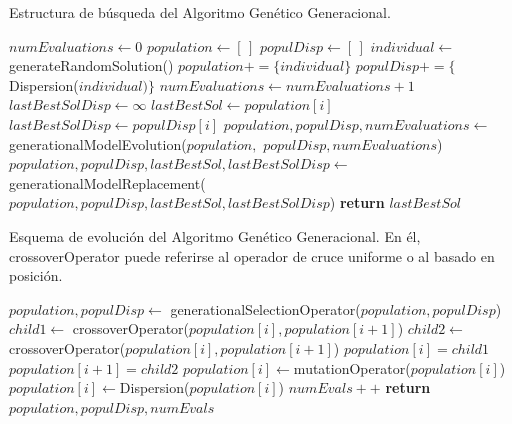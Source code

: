 \begin{algorithm}[H]
    \caption{Estructura de búsqueda del Algoritmo Genético Generacional.}
\begin{algorithmic}
    \State $numEvaluations \leftarrow 0$
    \State $population \leftarrow [ \, ]$
    \State $populDisp \leftarrow [ \, ]$
     
        \State $individual \leftarrow$ generateRandomSolution()
        \State $population += \{individual\}$
        \State $populDisp += \{$Dispersion($individual)\}$
        \State $numEvaluations \leftarrow numEvaluations + 1$
    \EndFor
    \State
    \State $lastBestSolDisp \leftarrow \infty$
            \State $lastBestSol \leftarrow population[i]$
            \State $lastBestSolDisp \leftarrow populDisp[i]$
        \EndIf
    \EndFor
    \State
        \State $population, populDisp, numEvaluations \leftarrow$ generationalModelEvolution($population,$
        \State $populDisp, numEvaluations$)
        \State
        \State $population, populDisp, lastBestSol, lastBestSolDisp \leftarrow$ 
        \State generationalModelReplacement($population, populDisp, lastBestSol, lastBestSolDisp$)
    \EndWhile
    \State
    \State \textbf{return} $lastBestSol$
\EndProcedure
\end{algorithmic}
\end{algorithm}

\begin{algorithm}[H]
    \caption{Esquema de evolución del Algoritmo Genético Generacional. En él, crossoverOperator puede referirse al operador de cruce uniforme o al basado en posición.}
\begin{algorithmic}
    \State $population, populDisp \leftarrow$ generationalSelectionOperator($population, populDisp$)
        \State $child1 \leftarrow$ crossoverOperator($population[i], population[i+1]$)
        \State $child2 \leftarrow$ crossoverOperator($population[i], population[i+1]$)
        \State $population[i] = child1$
        \State $population[i+1] = child2$
    \EndFor
    \State
        \State $population[i] \leftarrow $mutationOperator($population[i]$)
    \EndFor
    \State
        \State $population[i] \leftarrow $Dispersion($population[i]$)
        \State $numEvals++$
    \EndFor
    \State
    \State \textbf{return} $population, populDisp, numEvals$
\EndProcedure
\end{algorithmic}
\end{algorithm}

